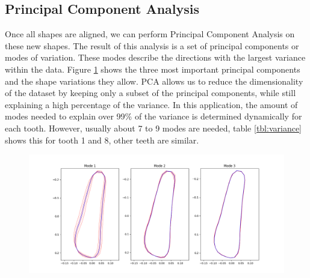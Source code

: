 \documentclass[11pt]{article}
\begin{document}
\subsection{Principal Component Analysis}
Once all shapes are aligned, we can perform Principal Component Analysis on these new shapes. The result of this analysis is a set of principal components or modes of variation. These modes describe the directions with the largest variance within the data. Figure \ref{fig:modes} shows the three most important principal components and the shape variations they allow. PCA allows us to reduce the dimensionality of the dataset by keeping only a subset of the principal components, while still explaining a high percentage of the variance. In this application, the amount of modes needed to explain over 99\% of the variance is determined dynamically for each tooth. However, usually about 7 to 9 modes are needed, table \ref{tbl:variance} shows this for tooth 1 and 8, other teeth are similar.  

\begin{figure}[H]
  \centering
  \includegraphics[width=\linewidth]{modes_and_mean}
  \label{fig:modes}
\end{figure}
\end{document}
